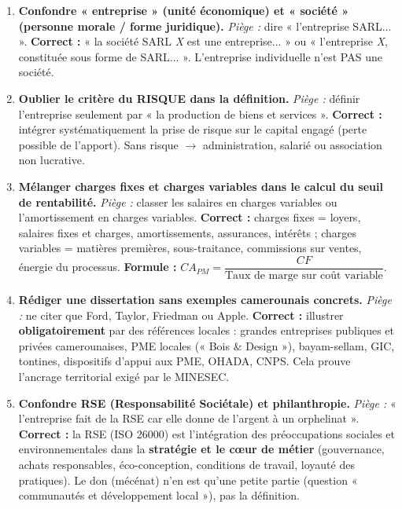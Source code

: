\documentclass[11pt]{article}
\newcommand{\cle}[1]{{\popxbold\color{popdark}#1}}
\begin{document}
\begin{attention}
    \begin{enumerate}
        \item \textbf{Confondre « entreprise » (unité économique) et « société » (personne morale / forme juridique).} \emph{Piège :} dire « l'entreprise SARL... ». \textbf{Correct :} « la société SARL \emph{X} est une entreprise... » ou « l'entreprise \emph{X}, constituée sous forme de SARL... ». L'entreprise individuelle n'est PAS une société.
        \item \textbf{Oublier le critère du RISQUE dans la définition.} \emph{Piège :} définir l'entreprise seulement par « la production de biens et services ». \textbf{Correct :} intégrer systématiquement la \cle{prise de risque} sur le capital engagé (perte possible de l'apport). Sans risque $\to$ administration, salarié ou association non lucrative.
        \item \textbf{Mélanger charges fixes et charges variables dans le calcul du seuil de rentabilité.} \emph{Piège :} classer les salaires en charges variables ou l'amortissement en charges variables. \textbf{Correct :} \cle{charges fixes} = loyers, salaires fixes et charges, amortissements, assurances, intérêts ; \cle{charges variables} = matières premières, sous-traitance, commissions sur ventes, énergie du processus. \textbf{Formule :} $CA_{PM} = \dfrac{CF}{\text{Taux de marge sur coût variable}}$.
        \item \textbf{Rédiger une dissertation sans exemples camerounais concrets.} \emph{Piège :} ne citer que Ford, Taylor, Friedman ou Apple. \textbf{Correct :} illustrer \textbf{obligatoirement} par des références locales : grandes entreprises publiques et privées camerounaises, PME locales (« Bois \& Design »), bayam-sellam, GIC, tontines, dispositifs d'appui aux PME, OHADA, CNPS. Cela prouve l'ancrage territorial exigé par le MINESEC.
        \item \textbf{Confondre RSE (Responsabilité Sociétale) et philanthropie.} \emph{Piège :} « l'entreprise fait de la RSE car elle donne de l'argent à un orphelinat ». \textbf{Correct :} la RSE (ISO 26000) est l'\cle{intégration} des préoccupations sociales et environnementales dans la \textbf{stratégie et le cœur de métier} (gouvernance, achats responsables, éco-conception, conditions de travail, loyauté des pratiques). Le don (mécénat) n'en est qu'une petite partie (question « communautés et développement local »), pas la définition.
    \end{enumerate}
\end{attention}
\end{document}
